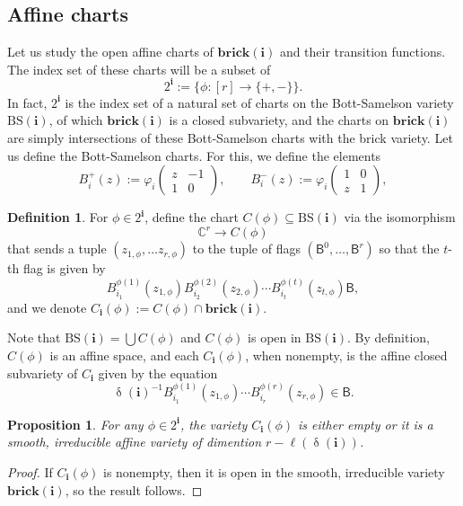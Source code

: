 \documentclass[a4paper, 11pt]{amsart}
\newcommand{\brick}{\mathbf{brick}}
\newcommand{\borel}{\mathsf{B}}
\newcommand{\flag}[1]{\mathsf{B}^{#1}}
\newcommand{\word}[1]{\mathbf{#1}}
\DeclareMathOperator{\dem}{\delta}
\newcommand{\C}{\mathbb{C}}
\newcommand{\BS}{\mathrm{BS}}
\newtheorem{proposition}[theorem]{Proposition}%
\theoremstyle{definition}
\newtheorem{definition}[theorem]{Definition}
\begin{document}
\subsection{Affine charts} Let us study the open affine charts of $\brick(\word{i})$ and their transition functions. The index set of these charts will be a subset of
\begin{equation}\label{eq:index-set-charts}
2^{\word{i}} := \{\phi: [r] \to \{+, -\}\}.
\end{equation}
In fact, $2^{\word{i}}$ is the index set of a natural set of charts on the Bott-Samelson variety $\BS(\word{i})$, of which $\brick(\word{i})$ is a closed subvariety, and the charts on $\brick(\word{i})$ are simply intersections of these Bott-Samelson charts with the brick variety. Let us define the Bott-Samelson charts. For this, we define the elements
\[
B_i^{+}(z) := \varphi_i\begin{pmatrix} z & -1 \\ 1 & 0 \end{pmatrix}, \qquad B_i^{-}(z) := \varphi_i\begin{pmatrix}1 & 0 \\ z & 1\end{pmatrix},
\]

\begin{definition}
For $\phi \in 2^{\word{i}}$, define the chart $C(\phi) \subseteq \BS(\word{i})$ via the isomorphism
\[
\C^{r} \to C(\phi)
\]
that sends a tuple $(z_{1, \phi}, \dots z_{r, \phi})$ to the tuple of flags $(\flag{0}, \dots, \flag{r})$ so that the $t$-th flag is given by 
\[
B_{i_1}^{\phi(1)}(z_{1, \phi})B_{i_2}^{\phi(2)}(z_{2, \phi})\cdots B_{i_t}^{\phi(t)}(z_{t, \phi})\borel,
\]
and we denote $C_{\word{i}}(\phi) := C(\phi) \cap \brick(\word{i})$. 
\end{definition}

Note that $\BS(\word{i}) = \bigcup C(\phi)$ and $C(\phi)$ is open in $\BS(\word{i})$. By definition, $C(\phi)$ is an affine space, and each $C_{\word{i}}(\phi)$, when nonempty, is the affine closed subvariety of $C_{\word{i}}$ given by the equation
\[
\dem(\word{i})^{-1}B_{i_1}^{\phi(1)}(z_{1, \phi})\cdots B_{i_r}^{\phi(r)}(z_{r, \phi}) \in \borel.
\]

\begin{proposition}\label{prop:irreducible}
    For any $\phi \in 2^{\word{i}}$, the variety $C_{\word{i}}(\phi)$ is either empty or it is a smooth, irreducible affine variety of dimention $r - \ell(\dem(\word{i}))$. 
\end{proposition}
\begin{proof}
    If $C_{\word{i}}(\phi)$ is nonempty, then it is open in the smooth, irreducible variety $\brick(\word{i})$, so the result follows.
\end{proof}
\end{document}
